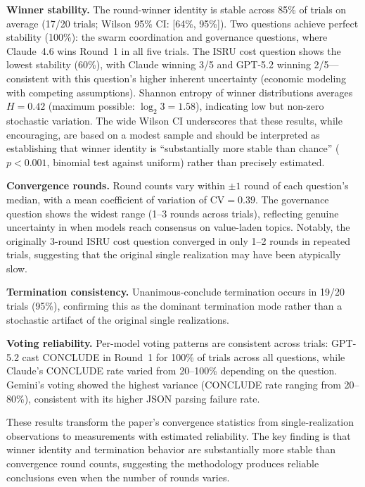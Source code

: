 \documentclass[11pt,a4paper]{article}
\begin{document}
\textbf{Winner stability.} The round-winner identity is stable across 85\% of trials on average (17/20 trials; Wilson 95\% CI: [64\%, 95\%]). Two questions achieve perfect stability (100\%): the swarm coordination and governance questions, where Claude~4.6 wins Round~1 in all five trials. The ISRU cost question shows the lowest stability (60\%), with Claude winning 3/5 and GPT-5.2 winning 2/5---consistent with this question's higher inherent uncertainty (economic modeling with competing assumptions). Shannon entropy of winner distributions averages $H = 0.42$ (maximum possible: $\log_2 3 = 1.58$), indicating low but non-zero stochastic variation. The wide Wilson CI underscores that these results, while encouraging, are based on a modest sample and should be interpreted as establishing that winner identity is ``substantially more stable than chance'' ($p < 0.001$, binomial test against uniform) rather than precisely estimated.

\textbf{Convergence rounds.} Round counts vary within $\pm 1$ round of each question's median, with a mean coefficient of variation of $\text{CV} = 0.39$. The governance question shows the widest range (1--3 rounds across trials), reflecting genuine uncertainty in when models reach consensus on value-laden topics. Notably, the originally 3-round ISRU cost question converged in only 1--2 rounds in repeated trials, suggesting that the original single realization may have been atypically slow.

\textbf{Termination consistency.} Unanimous-conclude termination occurs in 19/20 trials (95\%), confirming this as the dominant termination mode rather than a stochastic artifact of the original single realizations.

\textbf{Voting reliability.} Per-model voting patterns are consistent across trials: GPT-5.2 cast CONCLUDE in Round~1 for 100\% of trials across all questions, while Claude's CONCLUDE rate varied from 20--100\% depending on the question. Gemini's voting showed the highest variance (CONCLUDE rate ranging from 20--80\%), consistent with its higher JSON parsing failure rate.

These results transform the paper's convergence statistics from single-realization observations to measurements with estimated reliability. The key finding is that winner identity and termination behavior are substantially more stable than convergence round counts, suggesting the methodology produces reliable conclusions even when the number of rounds varies.

\end{document}
